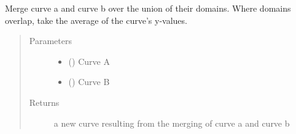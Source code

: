 \documentclass[letterpaper,10pt,english]{sphinxmanual}
\begin{document}

\begin{fulllineitems}
\label{\detokenize{pydv:curve.append}}
Merge curve a and curve b over the union of their domains. Where domains overlap, take
the average of the curve’s y-values.
\begin{quote}\begin{description}
\item[{Parameters}] \leavevmode\begin{itemize}
\item {} 
 () \textendash{} Curve A

\item {} 
 () \textendash{} Curve B

\end{itemize}

\item[{Returns}] \leavevmode
a new curve resulting from the merging of curve a and curve b

\end{description}\end{quote}

\end{fulllineitems}

\end{document}
